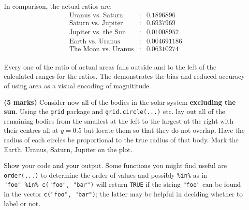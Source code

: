 \documentclass[9pt,letter]{article}
\begin{document}
In comparison, the actual ratios are: \[
\begin{array}{rll}
\text{Uranus vs. Saturn} &:& 0.1896896\\
\text{Saturn vs. Jupiter} &:& 0.6937969\\
\text{Jupiter vs. the Sun} &:& 0.01008957\\
\text{Earth vs. Uranus} &:& 0.004691186\\
\text{The Moon vs. Uranus} &:& 0.06310274\\
\end{array}
\]

Every one of the ratio of actual areas falls outside and to the left of
the calculated ranges for the ratios. The demonstrates the bias and
reduced accuracy of using area as a visual encoding of magnititude.

\item 

\textbf{(5 marks)} Consider now all of the bodies in the solar system
\textbf{excluding the sun}. Using the \texttt{grid} package and
\texttt{grid.circle(...)} etc. lay out all of the remaining bodies from
the smallest at the left to the largest at the right with their centres
all at \(y=0.5\) but locate them so that they do not overlap. Have the
radius of each circles be proportional to the true radius of that body.
Mark the Earth, Uranus, Saturn, Jupiter on the plot.

Show your code and your output. Some functions you might find useful are
\texttt{order(...)} to determine the order of values and possibly
\texttt{\%in\%} as in \texttt{"foo"\ \%in\%\ c("foo",\ "bar")} will
return \texttt{TRUE} if the string \texttt{"foo"} can be found in the
vector \texttt{c("foo",\ "bar")}; the latter may be helpful in deciding
whether to label or not.
\end{document}
